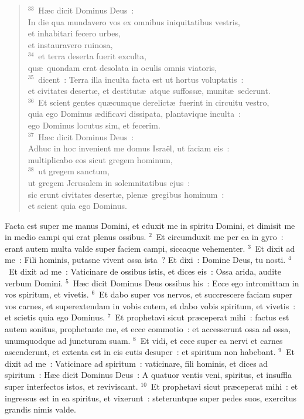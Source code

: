 \begin{flushleft}\begin{verse}${}^{33}$~H\ae c dicit Dominus Deus~:\\ In die qua mundavero vos ex omnibus iniquitatibus vestris,\\ et inhabitari fecero urbes,\\ et instauravero ruinosa,\\
${}^{34}$~et terra deserta fuerit exculta,\\ qu\ae\ quondam erat desolata in oculis omnis viatoris,\\
${}^{35}$~dicent~: Terra illa inculta facta est ut hortus voluptatis~:\\ et civitates desert\ae , et destitut\ae\ atque suffoss\ae , munit\ae\ sederunt.\\
${}^{36}$~Et scient gentes qu\ae cumque derelict\ae\ fuerint in circuitu vestro,\\ quia ego Dominus \ae dificavi dissipata, plantavique inculta~:\\ ego Dominus locutus sim, et fecerim.\\
${}^{37}$~H\ae c dicit Dominus Deus~:\\ Adhuc in hoc invenient me domus Isra\"el, ut faciam eis~:\\ multiplicabo eos sicut gregem hominum,\\
${}^{38}$~ut gregem sanctum,\\ ut gregem Jerusalem in solemnitatibus ejus~:\\ sic erunt civitates desert\ae , plen\ae\ gregibus hominum~:\\ et scient quia ego Dominus.\end{verse}\end{flushleft}



\bchapter
\lettrine[lines=3,image=true,loversize=0.05,lraise=-0.03]{F}{}acta est super me manus Domini, et eduxit me in spiritu Domini, et dimisit me in medio campi qui erat plenus ossibus.
${}^{2}$~Et circumduxit me per ea in gyro~: erant autem multa valde super faciem campi, siccaque vehementer.
${}^{3}$~Et dixit ad me~: Fili hominis, putasne vivent ossa ista~? Et dixi~: Domine Deus, tu nosti.
${}^{4}$~Et dixit ad me~: Vaticinare de ossibus istis, et dices eis~: Ossa arida, audite verbum Domini.
${}^{5}$~H\ae c dicit Dominus Deus ossibus his~: Ecce ego intromittam in vos spiritum, et vivetis.
${}^{6}$~Et dabo super vos nervos, et succrescere faciam super vos carnes, et superextendam in vobis cutem, et dabo vobis spiritum, et vivetis~: et scietis quia ego Dominus.
${}^{7}$~Et prophetavi sicut pr\ae ceperat mihi~: factus est autem sonitus, prophetante me, et ecce commotio~: et accesserunt ossa ad ossa, unumquodque ad juncturam suam.
${}^{8}$~Et vidi, et ecce super ea nervi et carnes ascenderunt, et extenta est in eis cutis desuper~: et spiritum non habebant.
${}^{9}$~Et dixit ad me~: Vaticinare ad spiritum~: vaticinare, fili hominis, et dices ad spiritum~: H\ae c dicit Dominus Deus~: A quatuor ventis veni, spiritus, et insuffla super interfectos istos, et reviviscant.
${}^{10}$~Et prophetavi sicut pr\ae ceperat mihi~: et ingressus est in ea spiritus, et vixerunt~: steteruntque super pedes suos, exercitus grandis nimis valde.


